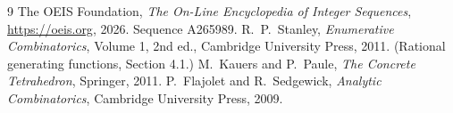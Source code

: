 \documentclass[11pt,a4paper]{article}
\theoremstyle{plain}
\theoremstyle{definition}
\begin{document}
\begin{thebibliography}{9}
 The OEIS Foundation, \emph{The On-Line Encyclopedia of Integer
Sequences}, \url{https://oeis.org}, 2026. Sequence A265989.
 R.~P.~Stanley, \emph{Enumerative Combinatorics}, Volume 1, 2nd ed.,
Cambridge University Press, 2011. (Rational generating functions, Section 4.1.)
 M.~Kauers and P.~Paule, \emph{The Concrete Tetrahedron}, Springer, 2011.
 P.~Flajolet and R.~Sedgewick, \emph{Analytic Combinatorics}, Cambridge
University Press, 2009.
\end{thebibliography}
\end{document}
